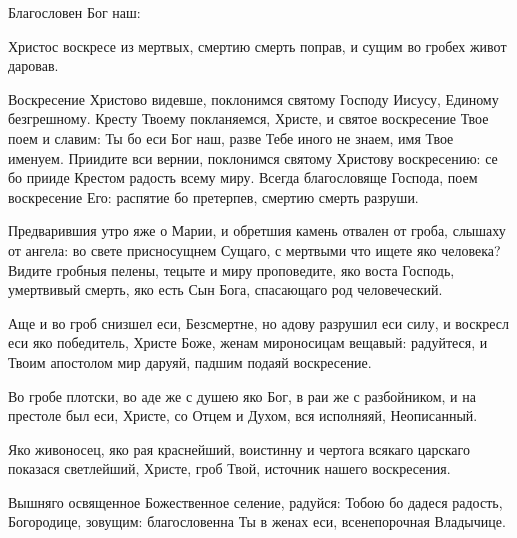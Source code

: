 \begin{mymulticols}

 Благословен Бог наш:

 \MolitvamiSviatyhOtecNashih

Христос воскресе из мертвых, смертию смерть поправ, и сущим во гробех живот даровав.  

Воскресение Христово видевше, поклонимся святому Господу Иисусу, Единому безгрешному. Кресту Твоему покланяемся, Христе, и святое воскресение Твое поем и славим: Ты бо еси Бог наш, разве Тебе иного не знаем, имя Твое именуем. Приидите вси вернии, поклонимся святому Христову воскресению: се бо прииде Крестом радость всему миру. Всегда благословяще Господа, поем воскресение Его: распятие бо претерпев, смертию смерть разруши.  


Предварившия утро яже о Марии, и обретшия камень отвален от гроба, слышаху от ангела: во свете присносущнем Сущаго, с мертвыми что ищете яко человека? Видите гробныя пелены, тецыте и миру проповедите, яко воста Господь, умертвивый смерть, яко есть Сын Бога, спасающаго род человеческий. 


Аще и во гроб снизшел еси, Безсмертне, но адову разрушил еси силу, и воскресл еси яко победитель, Христе Боже, женам мироносицам вещавый: радуйтеся, и Твоим апостолом мир даруяй, падшим подаяй воскресение. 


Во гробе плотски, во аде же с душею яко Бог, в раи же с разбойником, и на престоле был еси, Христе, со Отцем и Духом, вся исполняяй, Неописанный. 

\slava

Яко живоносец, яко рая краснейший, воистинну и чертога всякаго царскаго показася светлейший, Христе, гроб Твой, источник нашего воскресения. 

\inyne

Вышняго освященное Божественное селение, радуйся: Тобою бо дадеся радость, Богородице, зовущим: благословенна Ты в женах еси, всенепорочная Владычице. 


\end{mymulticols}

